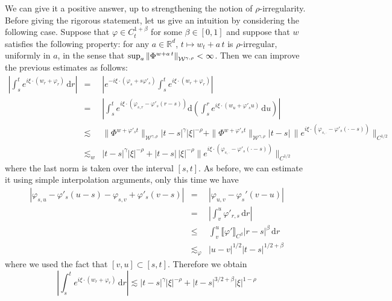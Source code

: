 \documentclass[10pt]{article}
\newcommand{\comma}{{,}}
\newcommand{\mathd}{\mathrm{d}}
\newcommand{\tmcolor}[2]{{\color{#1}{#2}}}
\begin{document}
We can give it a positive answer, up to strengthening the notion of
$\rho$-irregularity. Before giving the rigorous statement, let us give an
intuition by considering the following case. Suppose that $\varphi \in C^{1 +
\beta}_t$ for some $\beta \in [0, 1]$ and suppose that $w$ satisfies the
following property: for any $a \in \mathbb{R}^d$, $t \mapsto w_t + a \, t$ is
$\rho$-irregular, uniformly in $a$, in the sense that $\sup_a \left\|
\tmcolor{blue}{\tmcolor{black}{\Phi^{w + a \, t}}}
\right\|_{\mathcal{W}^{\gamma \comma \rho}} < \infty$. Then we can improve the
previous estimates as follows:
\begin{eqnarray*}
  \left| \int_s^t e^{i \xi \cdot (w_r + \varphi_r)} \, \mathd r \right| & = &
  \left| e^{- i \xi \cdot (\varphi_s + s \varphi'_s)} \int^t_s e^{i \xi \cdot
  (w_r + \varphi_r)} \right|\\
  & = & \left| \int_s^t e^{i \xi \cdot (\varphi_{s, r} - \varphi'_s (r - s))}
  \mathd \left( \int_s^r e^{i \xi \cdot (w_u + \varphi'_s u)} \, \mathd u
  \right) \right|\\
  & \lesssim & \| \Phi^{w + \varphi'_s t} \|_{\mathcal{W}^{\gamma, \rho}} | t
  - s |^{\gamma} | \xi |^{- \rho} + \| \Phi^{w + \varphi'_s t}
  \|_{\mathcal{W}^{\gamma, \rho}} | t - s | \, \| e^{i \xi \cdot (\varphi_{s,
  \cdot} - \varphi'_s (\cdot - s))} \|_{C^{1 / 2}}\\
  & \lesssim_w & | t - s |^{\gamma} | \xi |^{- \rho} + | t - s | \, | \xi
  |^{- \rho} \| e^{i \xi \cdot (\varphi_{s, \cdot} - \varphi'_s (\cdot - s))}
  \|_{C^{1 / 2}}
\end{eqnarray*}
where the last norm is taken over the interval $[s, t]$. As before, we can
estimate it using simple interpolation arguments, only this time we have
\[ \begin{array}{lll}
     | \varphi_{s, u} - \varphi'_s (u - s) - \varphi_{s, v} + \varphi'_s (v -
     s) | & = & | \varphi_{u, v} - \varphi_s' (v - u) |\\
     & = & \left| \int_v^u \varphi'_{r, s} \, \mathd r \right|\\
     & \leqslant & \int_v^u \llbracket \varphi' \rrbracket_{C^{\beta}} | r -
     s |^{\beta} \, \mathd r\\
     & \lesssim_{\varphi} & | u - v |^{1 / 2} | t - s |^{1 / 2 + \beta}
   \end{array} \]
where we used the fact that $[v, u] \subset [s, t]$. Therefore we obtain
\[ \left| \int_s^t e^{i \xi \cdot (w_r + \varphi_r)} \, \mathd r \right|
   \lesssim | t - s |^{\gamma} | \xi |^{- \rho} + | t - s |^{3 / 2 + \beta} |
   \xi |^{1 - \rho} \]
\end{document}
